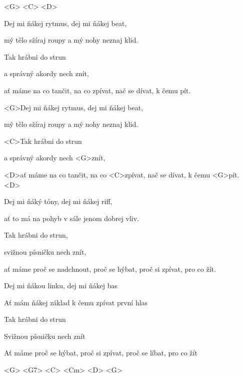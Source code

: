 

\ifdefined\TPBAND

<G> <C> <D>
 
\zs
Dej mi ňákej rytmus, dej mi ňákej beat,

mý tělo sžíraj roupy a mý nohy neznaj klid.

Tak hrábni do strun

a správný akordy nech znít,

ať máme na co tančit, na co zpívat, nač se dívat, k čemu pít.
\ks

\else
\zs
<G>Dej mi ňákej rytmus, dej mi ňákej beat,

mý tělo sžíraj roupy a mý nohy neznaj klid.

<C>Tak hrábni do strun

a správný akordy nech <G>znít,

<D>ať máme na co tančit, na co <C>zpívat, nač se dívat, k čemu <G>pít. <D>
\ks
\fi

\zs
Dej mi ňáký tóny, dej mi ňákej riff,

ať to má na pohyb v sále jenom dobrej vliv.

Tak hrábni do strun,

svižnou písničku nech znít,

ať máme proč se nadchnout, proč se hýbat, proč si zpívat, pro co žít.
\ks

\zs
Dej mi ňákou linku, dej mi ňákej bas

Ať mám ňákej základ k čemu zpívat první hlas

Tak hrábni do strun

Svižnou písničku nech znít

Ať máme proč se hýbat, proč si zpívat, proč se líbat, pro co žít
\ks

\ifdefined\TPBAND
<G> <G7> <C> <Cm> <D> <G>
\fi

\kp
